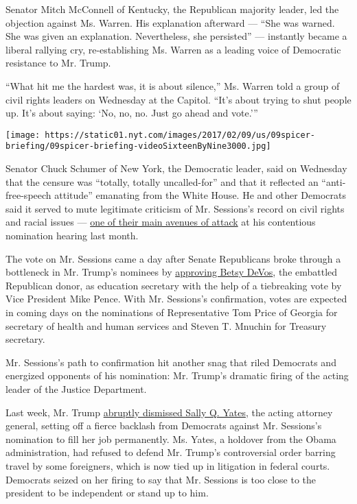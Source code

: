 Senator Mitch McConnell of Kentucky, the Republican majority leader, led
the objection against Ms. Warren. His explanation afterward --- ``She
was warned. She was given an explanation. Nevertheless, she persisted''
--- instantly became a liberal rallying cry, re-establishing Ms. Warren
as a leading voice of Democratic resistance to Mr. Trump.

``What hit me the hardest was, it is about silence,'' Ms. Warren told a
group of civil rights leaders on Wednesday at the Capitol. ``It's about
trying to shut people up. It's about saying: `No, no, no. Just go ahead
and vote.'''

\texttt{[image: https://static01.nyt.com/images/2017/02/09/us/09spicer-briefing/09spicer-briefing-videoSixteenByNine3000.jpg]}

Senator Chuck Schumer of New York, the Democratic leader, said on
Wednesday that the censure was ``totally, totally uncalled-for'' and
that it reflected an ``anti-free-speech attitude'' emanating from the
White House. He and other Democrats said it served to mute legitimate
criticism of Mr. Sessions's record on civil rights and racial issues ---
\href{http://nyti.ms/2j90h5z}{one of their main avenues of attack} at
his contentious nomination hearing last month.

The vote on Mr. Sessions came a day after Senate Republicans broke
through a bottleneck in Mr. Trump's nominees by
\href{https://www.nytimes.com/2017/02/07/us/politics/betsy-devos-education-secretary-confirmed.html}{approving
Betsy DeVos}, the embattled Republican donor, as education secretary
with the help of a tiebreaking vote by Vice President Mike Pence. With
Mr. Sessions's confirmation, votes are expected in coming days on the
nominations of Representative Tom Price of Georgia for secretary of
health and human services and Steven T. Mnuchin for Treasury secretary.

Mr. Sessions's path to confirmation hit another snag that riled
Democrats and energized opponents of his nomination: Mr. Trump's
dramatic firing of the acting leader of the Justice Department.

Last week, Mr. Trump
\href{https://www.nytimes.com/2017/01/30/us/politics/trump-immigration-ban-memo.html}{abruptly
dismissed Sally Q. Yates}, the acting attorney general, setting off a
fierce backlash from Democrats against Mr. Sessions's nomination to fill
her job permanently. Ms. Yates, a holdover from the Obama
administration, had refused to defend Mr. Trump's controversial order
barring travel by some foreigners, which is now tied up in litigation in
federal courts. Democrats seized on her firing to say that Mr. Sessions
is too close to the president to be independent or stand up to him.

